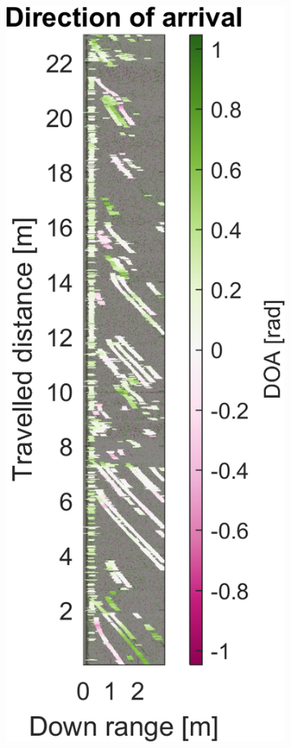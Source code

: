 \begin{figure}[htbp]
\begin{subfigure}[t]{0.475\linewidth}
    \end{subfigure}\bigskip\\
    \begin{subfigure}[t]{0.475\linewidth}
        \centering
        \includegraphics[width=\linewidth,max height=.475\textheight]{gfx/results/sauna_doa.png}

\end{subfigure}
\end{figure}
